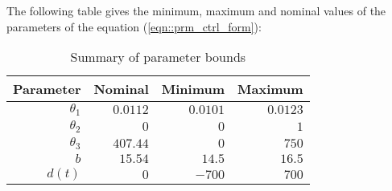 The following table gives the minimum, maximum and nominal values of the parameters of the equation (\ref{eqn::prm_ctrl_form}):

\begin{table}[H]
    \centering
    \begin{tabular}{r r r r}
        \hline \hline
        Parameter &Nominal & Minimum & Maximum \\ \hline \hline
        $\theta_1$            &
        $0.0112$              &
        $0.0101$              &
        $0.0123$

        \\
        $\theta_2$               &
        $0$                      &
        $0$                      &
        $1$
        \\
        $\theta_3$                 &
        $407.44$                   &
        $0$                        &
        $750$
        \\
        $b$                        &
        $15.54$                    &
        $14.5$                     &
        $16.5$
        \\
        $d(t)$                   &
        $0$                      &
        $-700$                   &
        $700$
        \\
        \hline \hline
    \end{tabular}
    \caption{Summary of parameter bounds}
    \label{tab::parm_bounds}
\end{table}
